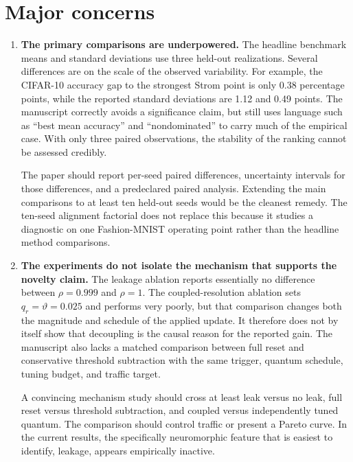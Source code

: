 \documentclass[10pt]{article}
\begin{document}
\section*{Major concerns}

\begin{enumerate}
  \item \textbf{The primary comparisons are underpowered.}
  The headline benchmark means and standard deviations use three held-out
  realizations. Several differences are on the scale of the observed
  variability. For example, the CIFAR-10 accuracy gap to the strongest Strom
  point is only 0.38 percentage points, while the reported standard deviations
  are 1.12 and 0.49 points. The manuscript correctly avoids a significance
  claim, but still uses language such as ``best mean accuracy'' and
  ``nondominated'' to carry much of the empirical case. With only three paired
  observations, the stability of the ranking cannot be assessed credibly.

  The paper should report per-seed paired differences, uncertainty intervals
  for those differences, and a predeclared paired analysis. Extending the main
  comparisons to at least ten held-out seeds would be the cleanest remedy. The
  ten-seed alignment factorial does not replace this because it studies a
  diagnostic on one Fashion-MNIST operating point rather than the headline
  method comparisons.

  \item \textbf{The experiments do not isolate the mechanism that supports the
  novelty claim.}
  The leakage ablation reports essentially no difference between
  $\rho=0.999$ and $\rho=1$. The coupled-resolution ablation sets
  $q_r=\vartheta=0.025$ and performs very poorly, but that comparison changes
  both the magnitude and schedule of the applied update. It therefore does not
  by itself show that decoupling is the causal reason for the reported gain.
  The manuscript also lacks a matched comparison between full reset and
  conservative threshold subtraction with the same trigger, quantum schedule,
  tuning budget, and traffic target.

  A convincing mechanism study should cross at least leak versus no leak,
  full reset versus threshold subtraction, and coupled versus independently
  tuned quantum. The comparison should control traffic or present a Pareto
  curve. In the current results, the specifically neuromorphic feature that is
  easiest to identify, leakage, appears empirically inactive.


\end{enumerate}
\end{document}
